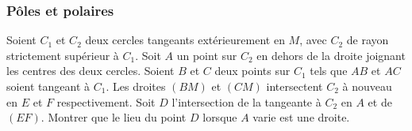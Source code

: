 \subsubsection{Pôles et polaires}


\begin{exo}
Soient $C_1$ et $C_2$ deux cercles tangeants extérieurement en $M$, avec $C_2$ de rayon strictement supérieur à $C_1$. Soit $A$ un point sur $C_2$ en dehors de la droite joignant les centres des deux cercles. Soient $B$ et $C$ deux points sur $C_1$ tels que $AB$ et $AC$ soient tangeant à $C_1$. Les droites $(BM)$ et $(CM)$ intersectent $C_2$ à nouveau en $E$ et $F$ respectivement. Soit $D$ l'intersection de la tangeante à $C_2$ en $A$ et de $(EF)$. Montrer que le lieu du point $D$ lorsque $A$ varie est une droite.
\end{exo}


